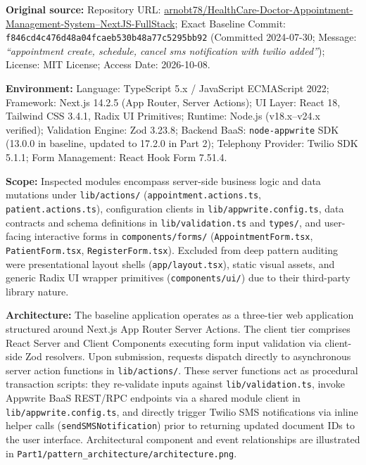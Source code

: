 \documentclass[11pt,a4paper]{article}
\newcommand{\entry}[2]{\textbf{#1:} #2\par}
\begin{document}
\entry{Original source}{Repository URL: \href{https://github.com/arnobt78/HealthCare-Doctor-Appointment-Management-System--NextJS-FullStack}{arnobt78/HealthCare-Doctor-Appointment-Management-System--NextJS-FullStack}; Exact Baseline Commit: \texttt{f846cd4c476d48a04fcaeb530b48a77c5295bb92} (Committed 2024-07-30; Message: \textit{``appointment create, schedule, cancel sms notification with twilio added''}); License: MIT License; Access Date: 2026-10-08.}

\entry{Environment}{Language: TypeScript 5.x / JavaScript ECMAScript 2022; Framework: Next.js 14.2.5 (App Router, Server Actions); UI Layer: React 18, Tailwind CSS 3.4.1, Radix UI Primitives; Runtime: Node.js (v18.x--v24.x verified); Validation Engine: Zod 3.23.8; Backend BaaS: \texttt{node-appwrite} SDK (13.0.0 in baseline, updated to 17.2.0 in Part 2); Telephony Provider: Twilio SDK 5.1.1; Form Management: React Hook Form 7.51.4.}

\entry{Scope}{Inspected modules encompass server-side business logic and data mutations under \texttt{lib/actions/} (\texttt{appointment.actions.ts}, \texttt{patient.actions.ts}), configuration clients in \texttt{lib/appwrite.config.ts}, data contracts and schema definitions in \texttt{lib/validation.ts} and \texttt{types/}, and user-facing interactive forms in \texttt{components/forms/} (\texttt{AppointmentForm.tsx}, \texttt{PatientForm.tsx}, \texttt{RegisterForm.tsx}). Excluded from deep pattern auditing were presentational layout shells (\texttt{app/layout.tsx}), static visual assets, and generic Radix UI wrapper primitives (\texttt{components/ui/}) due to their third-party library nature.}

\entry{Architecture}{The baseline application operates as a three-tier web application structured around Next.js App Router Server Actions. The client tier comprises React Server and Client Components executing form input validation via client-side Zod resolvers. Upon submission, requests dispatch directly to asynchronous server action functions in \texttt{lib/actions/}. These server functions act as procedural transaction scripts: they re-validate inputs against \texttt{lib/validation.ts}, invoke Appwrite BaaS REST/RPC endpoints via a shared module client in \texttt{lib/appwrite.config.ts}, and directly trigger Twilio SMS notifications via inline helper calls (\texttt{sendSMSNotification}) prior to returning updated document IDs to the user interface. Architectural component and event relationships are illustrated in \texttt{Part1/pattern\_architecture/architecture.png}.}
\end{document}
